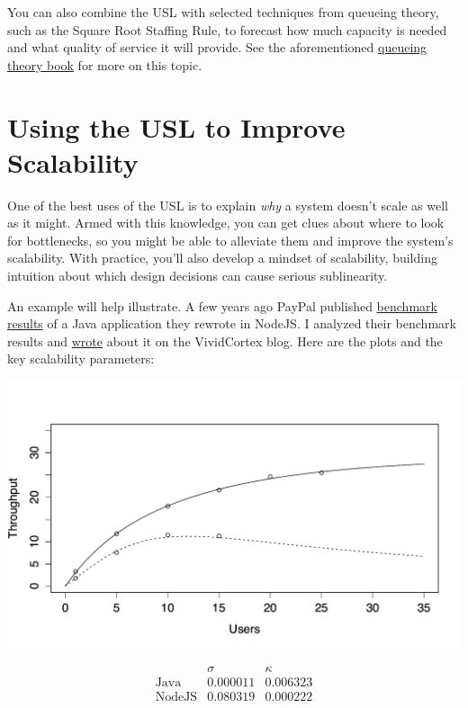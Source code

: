 \documentclass{vivid_layout}
\begin{document}
You can also combine the USL with selected techniques from queueing theory, such
as the Square Root Staffing Rule, to forecast how much capacity is needed and
what quality of service it will provide. See the aforementioned
\href{https://www.vividcortex.com/resources/queueing-theory/}{queueing theory
book} for more on this topic.

\section{Using the USL to Improve Scalability}

One of the best uses of the USL is to explain {\itshape why} a system doesn't
scale as well as it might. Armed with this knowledge, you can get clues about
where to look for bottlenecks, so you might be able to alleviate them and
improve the system's scalability.  With practice, you'll also develop a mindset
of scalability, building intuition about which design decisions can cause
serious sublinearity.

An example will help illustrate. A few years ago PayPal published
\href{https://www.paypal-engineering.com/2013/11/22/node-js-at-paypal/}{benchmark
results} of a Java application they rewrote in NodeJS. I analyzed their
benchmark results and
\href{https://www.vividcortex.com/blog/2013/12/09/analysis-of-paypals-node-vs-java-benchmarks/}{wrote} about it on the VividCortex blog.
Here are the plots and the key scalability parameters:
\begin{center}
\includegraphics[width=.85\linewidth]{scalability/paypal}
\end{center}
\[
\begin{array}{lcc}
& \sigma & \kappa \\
\mbox{Java} & 0.000011 & 0.006323 \\
\mbox{NodeJS} &  0.080319 & 0.000222 \\
\end{array}
\]
\end{document}
